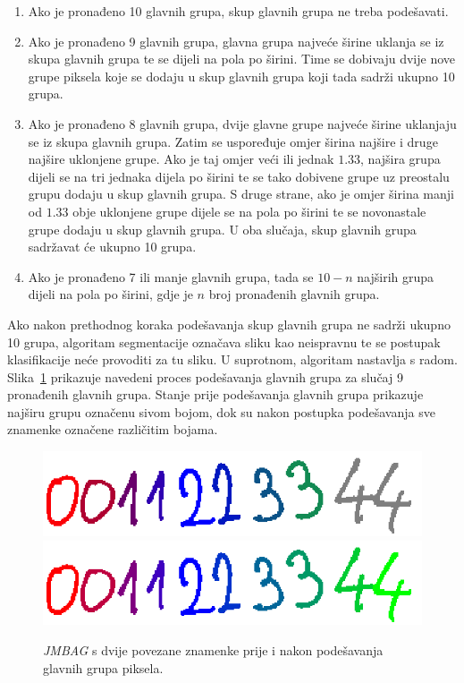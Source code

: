 \begin{enumerate}
    \item Ako je pronađeno 10 glavnih grupa, skup glavnih grupa ne treba podešavati.
    \item Ako je pronađeno 9 glavnih grupa, glavna grupa najveće širine uklanja se iz skupa glavnih grupa te se dijeli
    na pola po širini. Time se dobivaju dvije nove grupe piksela koje se dodaju u skup glavnih grupa koji tada sadrži
    ukupno 10 grupa.
    \item Ako je pronađeno 8 glavnih grupa, dvije glavne grupe najveće širine uklanjaju se iz skupa glavnih grupa.
    Zatim se uspoređuje omjer širina najšire i druge najšire uklonjene grupe. Ako je taj omjer veći ili jednak $1.33$,
    najšira grupa dijeli se na tri jednaka dijela po širini te se tako dobivene grupe uz preostalu grupu dodaju u skup
    glavnih grupa. S druge strane, ako je omjer širina manji od $1.33$ obje uklonjene grupe dijele se na pola po širini
    te se novonastale grupe dodaju u skup glavnih grupa. U oba slučaja, skup glavnih grupa sadržavat će ukupno 10 grupa.
    \item Ako je pronađeno 7 ili manje glavnih grupa, tada se $10 - n$ najširih grupa dijeli na pola po širini, gdje je
    $n$ broj pronađenih glavnih grupa.
\end{enumerate}
Ako nakon prethodnog koraka podešavanja skup glavnih grupa ne sadrži ukupno 10 grupa, algoritam segmentacije označava
sliku kao neispravnu te se postupak klasifikacije neće provoditi za tu sliku. U suprotnom, algoritam nastavlja s radom.
Slika\ \ref{fig:segmentation-division} prikazuje navedeni proces podešavanja glavnih grupa za slučaj 9 pronađenih glavnih
grupa. Stanje prije podešavanja glavnih grupa prikazuje najširu grupu označenu sivom bojom, dok su nakon postupka
podešavanja sve znamenke označene različitim bojama.\\
\begin{figure}[htb]
    \centering
    \includegraphics[width=12cm]{images/chapter4/segmentation-before-division.png}
    \includegraphics[width=12cm]{images/chapter4/segmentation-after-division.png}
    \caption{\emph{JMBAG} s dvije povezane znamenke prije i nakon podešavanja glavnih grupa piksela.}
    \label{fig:segmentation-division}
\end{figure}
